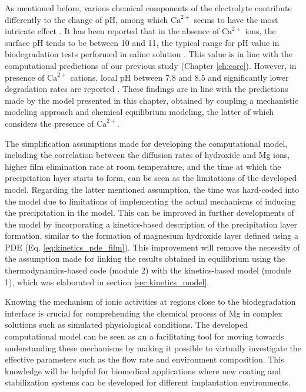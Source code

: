 As mentioned before, various chemical components of the electrolyte contribute differently to the change of pH, among which $\mathrm{Ca}^{2+}$ seems to have the most intricate effect \cite{Willumeit-Roemer2019}. It has been reported that in the absence of $\mathrm{Ca}^{2+}$ ions, the surface pH tends to be between 10 and 11, the typical range for pH value in biodegradation tests performed in saline solution \cite{Gonzalez2021}. This value is in line with the computational predictions of our previous study \cite{Barzegari2021} (Chapter \ref{ch:core}). However, in presence of $\mathrm{Ca}^{2+}$ cations, local pH between 7.8 and 8.5 and significantly lower degradation rates are reported \cite{Mei2019,Gnedenkov2019,Tefashe2015,Lamaka2009}. These findings are in line with the predictions made by the model presented in this chapter, obtained by coupling a mechanistic modeling approach and chemical equilibrium modeling, the latter of which considers the presence of $\mathrm{Ca}^{2+}$.

The simplification assumptions made for developing the computational model, including the correlation between the diffusion rates of hydroxide and Mg ions, higher film elimination rate at room temperature, and the time at which the precipitation layer starts to form,  can be seen as the limitations of the developed model. Regarding the latter mentioned assumption, the time was hard-coded into the model due to limitations of implementing the actual mechanisms of inducing the precipitation in the model. This can be improved in further developments of the model by incorporating a kinetics-based description of the precipitation layer formation, similar to the formation of magnesium hydroxide layer defined using a PDE (Eq. \ref{eq:kinetics_pde_film}). This improvement will remove the necessity of the assumption made for linking the results obtained in equilibrium using the thermodynamics-based code (module 2) with the kinetics-based model (module 1), which was elaborated in section \ref{sec:kinetics_model}.

Knowing the mechanism of ionic activities at regions close to the biodegradation interface is crucial for comprehending the chemical process of Mg in complex solutions such as simulated physiological conditions. The developed computational model can be seen as an a facilitating tool for moving towards understanding these mechanisms by making it possible to virtually investigate the effective parameters such as the flow rate and environment composition. This knowledge will be helpful for biomedical applications where new coating and stabilization systems can be developed for different implantation environments.

